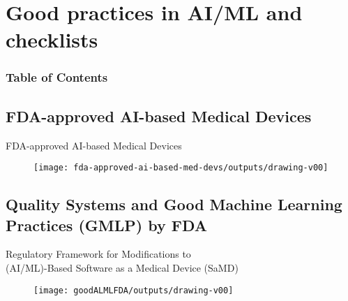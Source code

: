 \section{Good practices in AI/ML and checklists}
\begin{frame}
  \frametitle{Table of Contents}
  \tableofcontents[currentsection]
\end{frame}


\subsection{FDA-approved AI-based Medical Devices}

{
\begin{frame}{
FDA-approved AI-based Medical Devices
}{
}
      \begin{figure}
        \centering
        \texttt{[image: fda-approved-ai-based-med-devs/outputs/drawing-v00]}
      \end{figure}
\end{frame}
}


\subsection{Quality Systems and Good Machine Learning Practices (GMLP) by FDA}
{
\begin{frame}{
Regulatory Framework for Modifications to \\
(AI/ML)-Based Software as a Medical Device (SaMD)
}{
}
      \begin{figure}
        \centering
        \texttt{[image: goodALMLFDA/outputs/drawing-v00]}
      \end{figure}
\end{frame}
}



